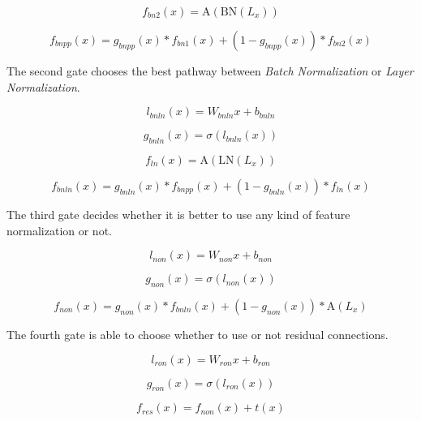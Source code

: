 \documentclass[conference]{IEEEtran}
\begin{document}
\begin{equation}
   f_{bn2}(x) = \text{A}(\text{BN}(L_x)) 
\end{equation}

\begin{equation}
  f_{bnpp}(x) = g_{bnpp}(x) * f_{bn1}(x) +  (1-g_{bnpp}(x)) * f_{bn2}(x)
\end{equation}

The second gate chooses the best pathway between \textit{Batch Normalization} or \textit{Layer Normalization}.

\begin{equation}
l_{bnln}(x) = W_{bnln}x + b_{bnln}
\end{equation}

\begin{equation}
 g_{bnln}(x) = \sigma(l_{bnln}(x))
\end{equation}

\begin{equation}
 f_{ln}(x) = \text{A}(\text{LN}(L_x))
\end{equation}

\begin{equation}
 f_{bnln}(x) = g_{bnln}(x) * f_{bnpp}(x) + (1-g_{bnln}(x)) * f_{ln}(x)
\end{equation}

The third gate decides whether it is better to use any kind of feature normalization or not.

\begin{equation}
l_{non}(x) = W_{non}x + b_{non}
\end{equation}

\begin{equation}
g_{non}(x) = \sigma(l_{non}(x))
\end{equation}

\begin{equation}
f_{non}(x) = g_{non}(x) * f_{bnln}(x) + (1-g_{non}(x)) * \text{A}(L_x)
\end{equation}

The fourth gate is able to choose whether to use or not residual connections.

\begin{equation}
l_{ron}(x) = W_{ron}x + b_{ron}
\end{equation}

\begin{equation}
g_{ron}(x) = \sigma(l_{ron}(x))
\end{equation}

\begin{equation}
 f_{res}(x) = f_{non}(x) + t(x)
\end{equation}
\end{document}
